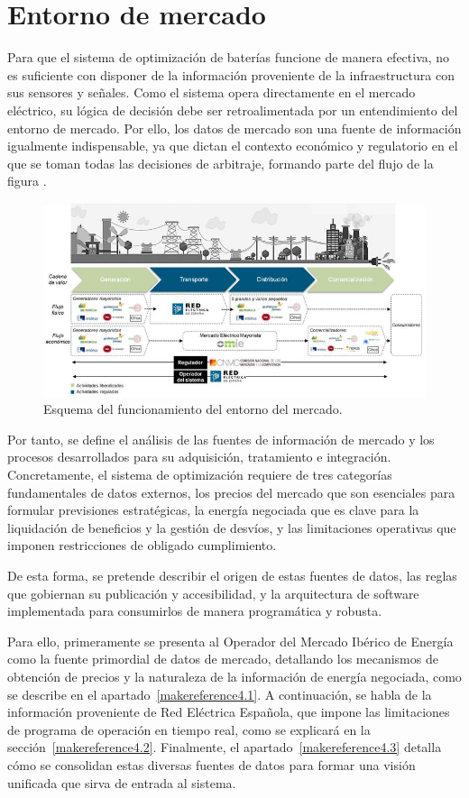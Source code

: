 \cleardoublepage

\chapter{Entorno de mercado}
\label{makereference4}

Para que el sistema de optimización de baterías funcione de manera efectiva, no es suficiente con disponer de la información proveniente de la infraestructura con sus sensores y señales. Como el sistema opera directamente en el mercado eléctrico, su lógica de decisión debe ser retroalimentada por un entendimiento del entorno de mercado. Por ello, los datos de mercado son una fuente de información igualmente indispensable, ya que dictan el contexto económico y regulatorio en el que se toman todas las decisiones de arbitraje, formando parte del flujo de la figura .

\begin{figure}
  \centering
  \includegraphics[width=0.5\linewidth]{figures/esquema-mercado.jpg}
  \caption{Esquema del funcionamiento del entorno del mercado.}
  \label{fig:esquema-mercado}
\end{figure}

Por tanto, se define el análisis de las fuentes de información de mercado y los procesos desarrollados para su adquisición, tratamiento e integración. Concretamente, el sistema de optimización requiere de tres categorías fundamentales de datos externos, los precios del mercado que son esenciales para formular previsiones estratégicas, la energía negociada que es clave para la liquidación de beneficios y la gestión de desvíos, y las limitaciones operativas que imponen restricciones de obligado cumplimiento.

De esta forma, se pretende describir el origen de estas fuentes de datos, las reglas que gobiernan su publicación y accesibilidad, y la arquitectura de software implementada para consumirlos de manera programática y robusta.

Para ello, primeramente se presenta al Operador del Mercado Ibérico de Energía como la fuente primordial de datos de mercado, detallando los mecanismos de obtención de precios y la naturaleza de la información de energía negociada, como se describe en el apartado~\ref{makereference4.1}. A continuación, se habla de la información proveniente de Red Eléctrica Española, que impone las limitaciones de programa de operación en tiempo real, como se explicará en la sección~\ref{makereference4.2}. Finalmente, el apartado~\ref{makereference4.3} detalla cómo se consolidan estas diversas fuentes de datos para formar una visión unificada que sirva de entrada al sistema.

